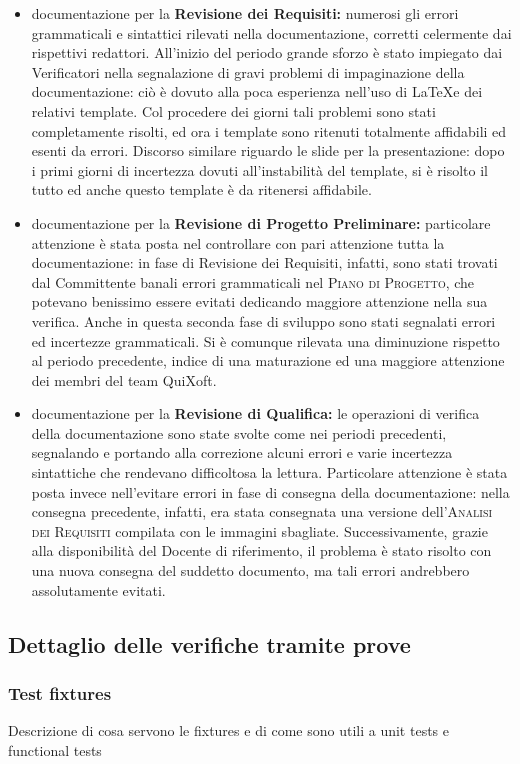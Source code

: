 \documentclass[11pt,a4paper]{article}
\begin{document}
\begin{itemize}
 \item documentazione per la \textbf{Revisione dei Requisiti:} numerosi gli errori grammaticali e sintattici rilevati nella documentazione, corretti celermente dai rispettivi redattori. All'inizio del periodo grande sforzo è stato impiegato dai Verificatori nella segnalazione di gravi problemi di impaginazione della documentazione: ciò è dovuto alla poca esperienza nell'uso di \LaTeX \space e dei relativi template. Col procedere dei giorni tali problemi sono stati completamente risolti, ed ora i template sono ritenuti totalmente affidabili ed esenti da errori. Discorso similare riguardo le slide per la presentazione: dopo i primi giorni di incertezza dovuti all'instabilità del template, si è risolto il tutto ed anche questo template è da ritenersi affidabile.
 \item documentazione per la \textbf{Revisione di Progetto Preliminare:} particolare attenzione è stata posta nel controllare con pari attenzione tutta la documentazione: in fase di Revisione dei Requisiti, infatti, sono stati trovati dal Committente banali errori grammaticali nel \textsc{Piano di Progetto}, che potevano benissimo essere evitati dedicando maggiore attenzione nella sua verifica. Anche in questa seconda fase di sviluppo sono stati segnalati errori ed incertezze grammaticali. Si è comunque rilevata una diminuzione rispetto al periodo precedente, indice di una maturazione ed una maggiore attenzione dei membri del team QuiXoft.
 \item documentazione per la \textbf{Revisione di Qualifica:} le operazioni di verifica della documentazione sono state svolte come nei periodi precedenti, segnalando e portando alla correzione alcuni errori e varie incertezza sintattiche che rendevano difficoltosa la lettura. Particolare attenzione è stata posta invece nell'evitare errori in fase di consegna della documentazione: nella consegna precedente, infatti, era stata consegnata una versione dell'\textsc{Analisi dei Requisiti} compilata con le immagini sbagliate. Successivamente, grazie alla disponibilità del Docente di riferimento, il problema è stato risolto con una nuova consegna del suddetto documento, ma tali errori andrebbero assolutamente evitati.
\end{itemize}
\subsection{Dettaglio delle verifiche tramite prove}
\subsubsection{Test fixtures}
Descrizione di cosa servono le fixtures e di come sono utili a unit tests e functional tests
\end{document}
